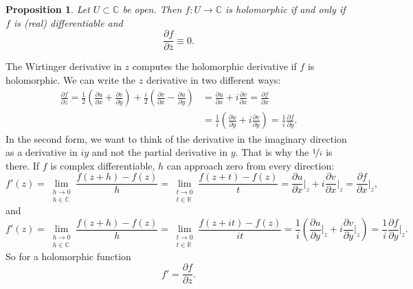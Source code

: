 \documentclass[12pt,openany]{book}
\newcommand{\C}{{\mathbb{C}}}
\newcommand{\R}{{\mathbb{R}}}
\theoremstyle{plain}
\newtheorem{prop}[thm]{Proposition}
\theoremstyle{remark}
\theoremstyle{definition}
\theoremstyle{exercise}
\theoremstyle{example}
\begin{document}
\begin{prop}
\label{prop:WirtCR}
Let $U \subset \C$ be open.  Then $f \colon U \to \C$ is
holomorphic if and only if
$f$ is (real) differentiable and
\begin{equation*}
\frac{\partial f}{\partial \bar{z}} \equiv 0 .
\end{equation*}
\end{prop}


The Wirtinger derivative in $z$ computes the holomorphic derivative
if $f$ is holomorphic.  We can write
the $z$ derivative in two different ways:
\begin{equation*}
\begin{split}
\frac{\partial f}{\partial z} 
=
\frac{1}{2}
\left(
\frac{\partial u}{\partial x} 
+ \frac{\partial v}{\partial y}
\right)
+
\frac{i}{2}
\left( \frac{\partial v}{\partial x} - \frac{\partial u}{\partial y}
\right) 
& =
\frac{\partial u}{\partial x} 
+ i \frac{\partial v}{\partial x}
 =
\frac{\partial f}{\partial x}
\\
& =
\frac{1}{i} \left(
\frac{\partial u}{\partial y}
+ i
\frac{\partial v}{\partial y} 
\right)
 =
\frac{1}{i}
\frac{\partial f}{\partial y}
.
\end{split}
\end{equation*}
In the second form, we want to think of the derivative in
the imaginary direction as a derivative in $iy$ and not the partial
derivative in $y$.  That is why the $\nicefrac{1}{i}$ is there.
If $f$ is complex differentiable, $h$ can
approach zero from every direction:
\begin{equation*}
f'(z) =
\lim_{\substack{h \to 0\\h\in\C}}
\frac{f(z+h)-f(z)}{h}
=
\lim_{\substack{t \to 0\\t\in\R}}
\frac{f(z+t)-f(z)}{t}
=
\frac{\partial u}{\partial x} \Big|_z
+ i \frac{\partial v}{\partial x}\Big|_z
 =
\frac{\partial f}{\partial x} \Big|_z ,
\end{equation*}
and
\begin{equation*}
f'(z) =
\lim_{\substack{h \to 0\\h\in\C}}
\frac{f(z+h)-f(z)}{h}
=
\lim_{\substack{t \to 0\\t\in\R}}
\frac{f(z+it)-f(z)}{it}
=
\frac{1}{i}
\left(
\frac{\partial u}{\partial y}  \Big|_z
+ i \frac{\partial v}{\partial y} \Big|_z
\right)
 =
\frac{1}{i}
\frac{\partial f}{\partial y} \Big|_z .
\end{equation*}
So for a holomorphic function
\begin{equation*}
f' =
\frac{\partial f}{\partial z} .
\end{equation*}
\end{document}
